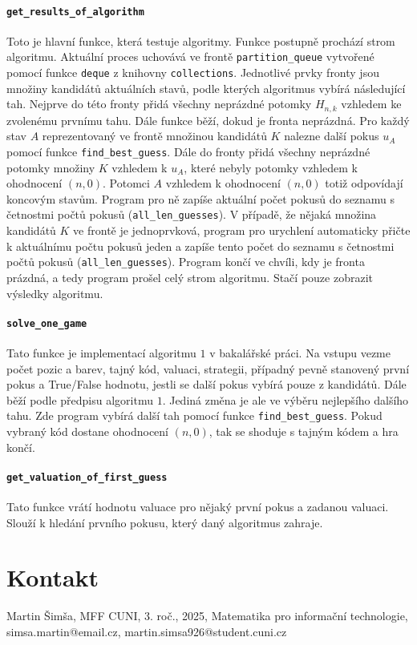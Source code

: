 \documentclass[12pt,a4paper]{article}
\begin{document}
\paragraph{\texttt{get\_results\_of\_algorithm}}
Toto je hlavní funkce, která testuje algoritmy. Funkce postupně prochází strom algoritmu. Aktuální proces uchovává ve frontě \texttt{partition\_queue} vytvořené pomocí funkce \texttt{deque} z knihovny \texttt{collections}. Jednotlivé prvky fronty jsou množiny kandidátů aktuálních stavů, podle kterých algoritmus vybírá následující tah. Nejprve do této fronty přidá všechny neprázdné potomky $H_{n,k}$ vzhledem ke zvolenému prvnímu tahu. Dále funkce běží, dokud je fronta neprázdná. Pro každý stav $A$ reprezentovaný ve frontě množinou kandidátů $K$ nalezne další pokus $u_A$ pomocí funkce \texttt{find\_best\_guess}. Dále do fronty přidá všechny neprázdné potomky množiny $K$ vzhledem k $u_A$, které nebyly potomky vzhledem k ohodnocení $(n,0)$. Potomci $A$ vzhledem k ohodnocení $(n,0)$ totiž odpovídají koncovým stavům. Program pro ně zapíše aktuální počet pokusů do seznamu s četnostmi počtů pokusů (\texttt{all\_len\_guesses}). V případě, že nějaká množina kandidátů $K$ ve frontě je jednoprvková, program pro urychlení automaticky přičte k aktuálnímu počtu pokusů jeden a zapíše tento počet do seznamu s četnostmi počtů pokusů (\texttt{all\_len\_guesses}). Program končí ve chvíli, kdy je fronta prázdná, a tedy program prošel celý strom algoritmu. Stačí pouze zobrazit výsledky algoritmu. 




\paragraph{\texttt{solve\_one\_game}}
Tato funkce je implementací algoritmu $1$ v bakalářské práci. Na vstupu vezme počet pozic a barev, tajný kód, valuaci, strategii, případný pevně stanovený první pokus a True/False hodnotu, jestli se další pokus vybírá pouze z kandidátů. Dále běží podle předpisu algoritmu $1$. Jediná změna je ale ve výběru nejlepšího dalšího tahu. Zde program vybírá další tah pomocí funkce \texttt{find\_best\_guess}. Pokud vybraný kód dostane ohodnocení $(n,0)$, tak se shoduje s tajným kódem a hra končí. 


\paragraph{\texttt{get\_valuation\_of\_first\_guess}}
Tato funkce vrátí hodnotu valuace pro nějaký první pokus a zadanou valuaci. Slouží k hledání prvního pokusu, který daný algoritmus zahraje.


\section{Kontakt}
Martin Šimša, MFF CUNI, 3. roč., 2025, Matematika pro informační technologie, simsa.martin@email.cz, martin.simsa926@student.cuni.cz
\end{document}
